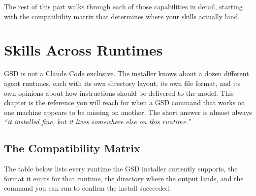 \documentclass[11pt,letterpaper,openany]{book}
\begin{document}
The rest of this part walks through each of those capabilities in detail,
starting with the compatibility matrix that determines where your skills
actually land.

\chapter{Skills Across Runtimes}

GSD is not a Claude Code exclusive. The installer knows about a dozen
different agent runtimes, each with its own directory layout, its own
file format, and its own opinions about how instructions should be
delivered to the model. This chapter is the reference you will reach for
when a GSD command that works on one machine appears to be missing on
another. The short answer is almost always \textit{``it installed fine,
but it lives somewhere else on this runtime.''}

\section{The Compatibility Matrix}

The table below lists every runtime the GSD installer currently supports,
the format it emits for that runtime, the directory where the output
lands, and the command you can run to confirm the install succeeded.
\end{document}
